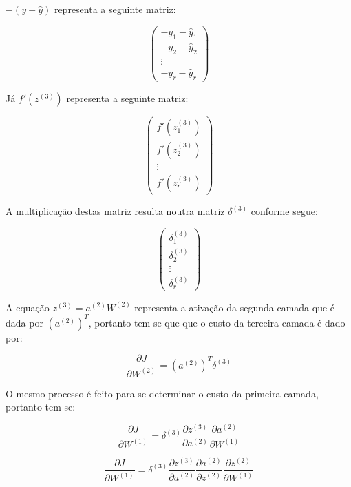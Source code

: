 $-(y-\hat{y})$ representa a seguinte matriz:

\begin{equation*}
\begin{pmatrix}
  -y_1 - \hat{y}_1\\
  -y_2 - \hat{y}_2\\
  \vdots \\
  -y_r - \hat{y}_r
\end{pmatrix}
\end{equation*}

Já $f'(z^{(3)})$ representa a seguinte matriz:

\begin{equation*}
\begin{pmatrix}
  f'(z^{(3)}_1)\\
  f'(z^{(3)}_2)\\
  \vdots \\
  f'(z^{(3)}_r)
\end{pmatrix}
\end{equation*}

A multiplicação destas matriz resulta noutra matriz $\delta^{(3)}$ conforme segue:

\begin{equation*}
\begin{pmatrix}
  \delta_1^{(3)}\\
  \delta_2^{(3)}\\
  \vdots \\
  \delta_r^{(3)}
\end{pmatrix}
\end{equation*}

A equação $ z^{(3)} = a^{(2)} W^{(2)} $ representa a ativação da segunda camada que é dada por $(a^{(2)})^T$, portanto tem-se que que o custo da terceira camada é dado por:

\begin{equation}
    \frac{\partial J}{\partial W^{(2)}} = (a^{(2)})^T \delta^{(3)}
\end{equation}

O mesmo processo é feito para se determinar o custo da primeira camada, portanto tem-se:

\begin{equation}
    \frac{\partial J}{\partial W^{(1)}} = \delta^{(3)} \frac{\partial z^{(3)}}{\partial a^{(2)}} \frac{\partial a^{(2)}}{\partial W^{(1)}}
\end{equation}

\begin{equation}
    \frac{\partial J}{\partial W^{(1)}} = \delta^{(3)} \frac{\partial z^{(3)}}{\partial a^{(2)}} \frac{\partial a^{(2)}}{\partial z^{(2)}} \frac{\partial z^{(2)}}{\partial W^{(1)}}
\end{equation}

